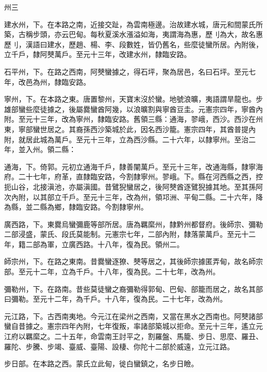 \begin{pinyinscope}
 州三



 建水州，下。在本路之南，近接交趾，為雲南極邊。治故建水城，唐元和間蒙氏所築，古稱步頭，亦云巴甸。每秋夏溪水漲溢如海，夷謂海為惠，歷刂為大，故名惠歷刂，漢語曰建水，歷趙、楊、李、段數姓，皆仍舊名，些麼徒蠻所居。內附後，立千戶，隸阿僰萬戶。至元十三年，改建水州，隸臨安路。



 石平州，下。在路之西南，阿僰蠻據之，得石坪，聚為居邑，名曰石坪。至元七年，改邑為州，隸臨安路。



 寧州，下。在本路之東。唐置黎州，天寶末沒於蠻。地號浪曠，夷語謂旱龍也。步雄部蠻些麼徒據之，後屬爨蠻酋阿幾，以浪曠割與寧酋豆圭。元憲宗四年，寧酋內附。至元十三年，改為寧州，隸臨安路。舊領三縣：通海，翏峨，西沙。西沙在州東，寧部蠻世居之。其裔孫西沙築城於此，因名西沙籠。憲宗四年，其酋普提內附，就居此城為萬戶。至元十三年，立為西沙縣。二十六年，以隸寧州。至治二年，並入州。領二縣：



 通海，下。倚郭。元初立通海千戶，隸善闡萬戶。至元十三年，改通海縣，隸寧海府。二十七年，府革，直隸臨安路，今割隸寧州。翏峨。下。縣在河西縣之西，控扼山谷，北接滇池，亦屬滇國。昔鷿猊蠻居之，後阿僰酋逐鷿猊據其地。至其孫阿次內附，以其部立千戶。至元十三年，改為州，領邛洲、平甸二縣。二十六年，降為縣，並二縣為鄉，隸臨安路。今割隸寧州。



 廣西路，下。東爨烏蠻彌鹿等部所居。唐為羈縻州，隸黔州都督府。後師宗、彌勒二部浸盛，蒙氏、段氏莫能制。元憲宗七年，二部內附，隸落蒙萬戶。至元十二年，籍二部為軍，立廣西路。十八年，復為民。領州二。



 師宗州，下。在路之東南。昔爨蠻逐獠、僰等居之，其後師宗據匿弄甸，故名師宗部。至元十二年，立為千戶。十八年，復為民。二十七年，改為州。



 彌勒州，下。在路南。昔些莫徒蠻之裔彌勒得郭甸、巴甸、部籠而居之，故名其部曰彌勒。至元十二年，為千戶。十八年，復為民。二十七年，改為州。



 元江路，下。古西南夷地。今元江在梁州之西南，又當在黑水之西南也。阿僰諸部蠻自昔據之。憲宗四年內附，七年復叛，率諸部築城以拒命。至元十三年，遙立元江府以羈縻之。二十五年，命雲南王討平之，割羅盤、馬籠、步日、思麼、羅丑、羅陀、步騰、步竭、臺威、臺陽、設棲、你陀十二部於威遠，立元江路。



 步日部。在本路之西。蒙氏立此甸，徙白蠻鎮之，名步日瞼。




\end{pinyinscope}
